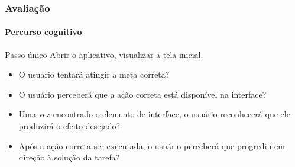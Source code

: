 \documentclass[14pt,beamer]{beamer}
\begin{document}
\begin{frame}
	\frametitle{Avaliação}
	\framesubtitle{Percurso cognitivo}

    \begin{block}{Passo único}
        Abrir o aplicativo, visualizar a tela inicial.
    \end{block}
    \begin{itemize}
        \item O usuário tentará atingir a meta correta?
        \item O usuário perceberá que a ação correta está disponível na interface?
        \item Uma vez encontrado o elemento de interface, o usuário reconhecerá que ele produzirá o 
efeito desejado?
        \item Após a ação correta ser executada, o usuário perceberá que progrediu em direção à solução 
da tarefa?
    \end{itemize}
\end{frame}
\end{document}
